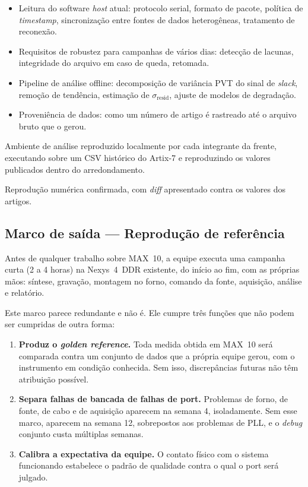 \documentclass[11pt,a4paper]{article}
\newcommand{\campo}[1]{\vspace{6pt}\noindent{\bfseries\color{lescgray}#1}\par\vspace{2pt}}
\begin{document}
\campo{Conteúdo}
\begin{itemize}
  \item Leitura do software \emph{host} atual: protocolo serial, formato de pacote,
        política de \emph{timestamp}, sincronização entre fontes de dados
        heterogêneas, tratamento de reconexão.
  \item Requisitos de robustez para campanhas de vários dias: detecção de lacunas,
        integridade do arquivo em caso de queda, retomada.
  \item Pipeline de análise offline: decomposição de variância PVT do sinal de
        \emph{slack}, remoção de tendência, estimação de $\sigma_\text{resid}$,
        ajuste de modelos de degradação.
  \item Proveniência de dados: como um número de artigo é rastreado até o arquivo
        bruto que o gerou.
\end{itemize}

\campo{Entregável}
Ambiente de análise reproduzido localmente por cada integrante da frente, executando
sobre um CSV histórico do Artix-7 e reproduzindo os valores publicados dentro do
arredondamento.

\campo{Critério de aceite}
Reprodução numérica confirmada, com \emph{diff} apresentado contra os valores dos artigos.

\subsection{Marco de saída --- Reprodução de referência}
\label{sec:marco-reproducao}

\begin{keybox}[title={Marco bloqueante da semana 4}]
Antes de qualquer trabalho sobre MAX~10, a equipe executa uma campanha curta
(2 a 4 horas) na Nexys~4~DDR existente, do início ao fim, com as próprias mãos:
síntese, gravação, montagem no forno, comando da fonte, aquisição, análise e relatório.
\end{keybox}

Este marco parece redundante e não é. Ele cumpre três funções que não podem ser
cumpridas de outra forma:

\begin{enumerate}
  \item \textbf{Produz o \emph{golden reference}.} Toda medida obtida em MAX~10 será
        comparada contra um conjunto de dados que a própria equipe gerou, com o
        instrumento em condição conhecida. Sem isso, discrepâncias futuras não têm
        atribuição possível.
  \item \textbf{Separa falhas de bancada de falhas de port.} Problemas de forno, de
        fonte, de cabo e de aquisição aparecem na semana 4, isoladamente. Sem esse
        marco, aparecem na semana 12, sobrepostos aos problemas de PLL, e o
        \emph{debug} conjunto custa múltiplas semanas.
  \item \textbf{Calibra a expectativa da equipe.} O contato físico com o sistema
        funcionando estabelece o padrão de qualidade contra o qual o port será julgado.
\end{enumerate}
\end{document}
